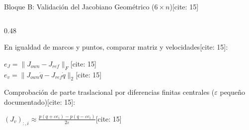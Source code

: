 \documentclass[aspectratio=169, xcolor={table,xcdraw}]{beamer}
\begin{document}
\begin{frame}{Bloque B: Validación del Jacobiano Geométrico ($6 \times n$)[cite: 15]}
\begin{columns}[T]
\begin{column}{0.48\textwidth}
            \begin{tcolorbox}[colback=white, colframe=ucbblue, title=\textbf{Métricas y Diferencias Finitas} {[cite: 15]}, boxsep=0.8mm, top=1mm, bottom=1mm]
                \scriptsize\raggedright
                En igualdad de marcos y puntos, comparar matriz y velocidades[cite: 15]:
                \begin{center}
                    $\boxed{ e_J = \|J_{own} - J_{ref}\|_F }$[cite: 15] \\[4pt]
                    $\boxed{ e_v = \|J_{own}\dot{q} - J_{ref}\dot{q}\|_2 }$[cite: 15]
                \end{center}
                Comprobación de parte traslacional por diferencias finitas centrales ($\varepsilon$ pequeño documentado)[cite: 15]:
                \begin{center}
                    $\boxed{ (J_v)_{:,i} \approx \frac{p(q + \varepsilon e_i) - p(q - \varepsilon e_i)}{2\varepsilon} }$[cite: 15]
                \end{center}
            \end{tcolorbox}
        \end{column}
    \end{columns}
\end{frame}
\end{document}
